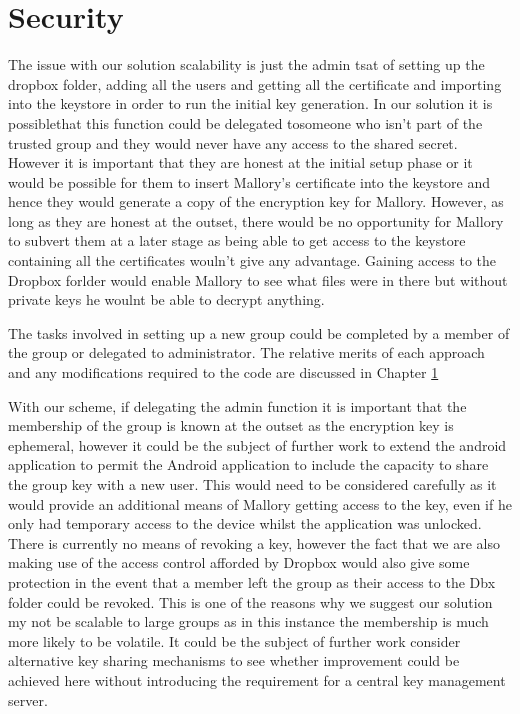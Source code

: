
\chapter{Security}
\label{cha:security}
The issue with our solution scalability is just the admin tsat of setting up the dropbox folder, adding all the users and getting all the certificate and importing into the keystore in order to run the initial key generation.  In our solution it is possiblethat this function could be delegated tosomeone who isn’t part of the trusted group and they would never have any access to the shared secret.  However it is important that they are honest at the initial setup phase or it would be possible for them to insert Mallory’s certificate into the keystore and hence they would generate a copy of the encryption key for Mallory.  However, as long as they are honest at the outset, there would be no opportunity for Mallory to subvert them at a later stage as being able to get access to the keystore containing all the certificates wouln’t give any advantage.  Gaining access to the Dropbox forlder would enable Mallory to see what files were in there but without private keys he woulnt be able to decrypt anything.

The tasks involved in setting up a new group could be completed by a member of the group or delegated to administrator. The relative merits of each approach and any modifications required to the code are discussed in Chapter \ref{cha:security} 

With our scheme, if delegating the admin function it is important that the membership of the group is known at the outset as the encryption key is ephemeral, however it could be the subject of further work to extend the android application to permit the Android application to include the capacity to share the group key with a new user.  This would need to be considered carefully as it would provide an additional means of Mallory getting access to the key, even if he only had temporary access to the device whilst the application was unlocked.  There is currently no means of revoking a key, however the fact that we are also making use of the access control afforded by Dropbox would also give some protection in the event that a member left the group as their access to the Dbx folder could be revoked.  This is one of the reasons why we suggest our solution my not be scalable to large groups as in this instance the membership is much more likely to be volatile.  It could be the subject of further work consider alternative key sharing mechanisms to see whether improvement could be achieved here without introducing the requirement for a central key management server.




